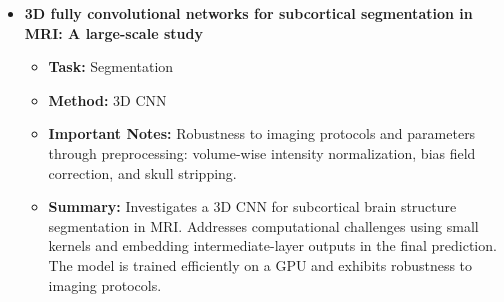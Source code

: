 \documentclass{article}
\begin{document}
\begin{itemize}[left=0pt]
  \item \textbf{3D fully convolutional networks for subcortical segmentation in MRI: A large-scale study}
  \begin{itemize}
    \item \textbf{Task:} Segmentation
    \item \textbf{Method:} 3D CNN
    \item \textbf{Important Notes:} Robustness to imaging protocols and parameters through preprocessing: volume-wise intensity normalization, bias field correction, and skull stripping.
    \item \textbf{Summary:} Investigates a 3D CNN for subcortical brain structure segmentation in MRI. Addresses computational challenges using small kernels and embedding intermediate-layer outputs in the final prediction. The model is trained efficiently on a GPU and exhibits robustness to imaging protocols.
  \end{itemize}

\end{itemize}
\end{document}
